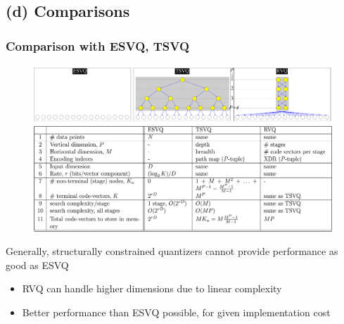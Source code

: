 \subsection{(d) Comparisons}
\begin{frame}[plain]
\frametitle{Comparison with ESVQ, TSVQ}
\framesubtitle{}
\mypagenum
\begin{changemargin}{-1.3in}{0in}
\begin{figure}		
\includegraphics[width=1.3\textwidth]{thesis/RVQ_comparisonWithESVQ_TSVQ.pdf}			
\end{figure}
	Generally, structurally constrained quantizers cannot provide performance as good as ESVQ
	\begin{itemize}
		\item RVQ can handle higher dimensions due to linear complexity
		\item Better performance than ESVQ possible, for given implementation cost
	\end{itemize}	

\end{changemargin}
\end{frame}




